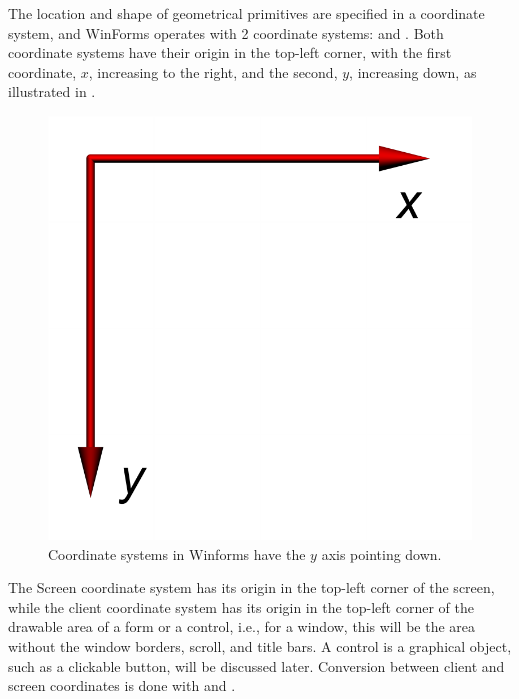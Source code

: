 \documentclass[fsharpnotes.tex]{subfiles}
\begin{document}
The location and shape of geometrical primitives are specified in a coordinate system, and WinForms operates with 2 coordinate systems:  and . Both coordinate systems have their origin in the top-left corner, with the first coordinate, $x$, increasing to the right, and the second, $y$, increasing down, as illustrated in .
%
\begin{figure}
  \centering
  \includegraphics[scale=0.3]{coordinateSystem}
  \caption{Coordinate systems in Winforms have the $y$ axis pointing down.}
  \label{fig:coordinateSystem}
\end{figure}
%
The Screen coordinate system has its origin in the top-left corner of the screen, while the client coordinate system has its origin in the top-left corner of the drawable area of a form or a control, i.e., for a window, this will be the area without the window borders, scroll, and title bars. A control is a graphical object, such as a clickable button, will be discussed later. Conversion between client and screen coordinates is done with  and . %
\end{document}
